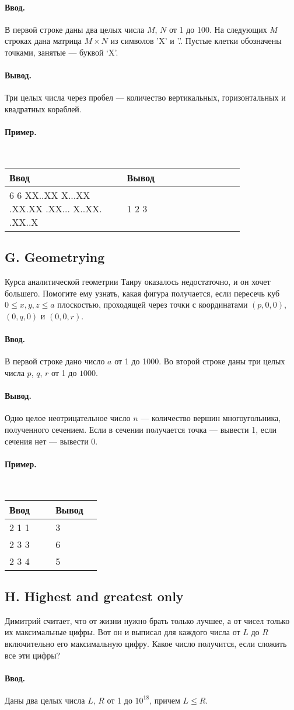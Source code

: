 \documentclass[12pt, a4paper]{article}
\newcommand{\informat}[1]
{
	\paragraph{Ввод.\\} #1
}
\newcommand{\outformat}[1]
{
	\paragraph{Вывод.\\} #1
}
\newcommand{\example}[2]
{
	\paragraph{Пример.\\}
	{\tt
	\begin{tabular}{|p{0.4\linewidth}|p{0.4\linewidth}|}
	\hline
	Ввод & Вывод \\
	\hline
	#1 & #2		\\
	\hline
	\end{tabular}
	}
}
\newcommand{\exampleee}[6]
{
	\paragraph{Пример.\\}
	{\tt
	\begin{tabular}{|p{0.4\linewidth}|p{0.4\linewidth}|}
	\hline
	Ввод 	& Вывод  	\\
	\hline
	#1 		& #2 		\\
	\hline
	#3		& #4		\\
	\hline
	#5		& #6		\\
	\hline
	\end{tabular}
	}
}
\begin{document}
\informat{В первой строке даны два целых числа $M$, $N$ от 1 до 100. На следующих $M$ строках дана матрица $M \times N$ из символов 'X' и '.'. Пустые клетки обозначены точками, занятые --- буквой ‘X’. }

\outformat{Три целых числа через пробел --- количество вертикальных, горизонтальных и квадратных кораблей.}

\example{
6 6\newline
XX..XX\newline
X...XX\newline
.XX.XX\newline
.XX...\newline
X..XX.\newline
.XX..X
}{1 2 3}

\newpage

\subsection*{G. Geometrying}

Курса аналитической геометрии Таиру оказалось недостаточно, и он хочет большего. Помогите ему узнать, какая фигура получается, если пересечь куб $0 \leqslant x, y, z \leqslant a$ плоскостью, проходящей через точки с координатами $(p, 0, 0)$, $(0, q, 0)$ и $(0, 0, r)$.

\informat{В первой строке дано число $a$ от 1 до 1000. Во второй строке даны три целых числа $p$, $q$, $r$ от 1 до $1000$.}

\outformat{Одно целое неотрицательное число $n$ --- количество вершин многоугольника, полученного сечением. Если в сечении получается точка --- вывести 1, если сечения нет --- вывести 0.}

\exampleee{
2 \newline
1 1 1}{3}{
2\newline
3 3 3}{6}{
2 \newline
2 3 4}{5}

\newpage

\subsection*{H. Highest and greatest only}

Димитрий считает, что от жизни нужно брать только лучшее, а от чисел только их максимальные цифры. Вот он и выписал для каждого числа от $L$ до $R$ включительно его максимальную цифру. Какое число получится, если сложить все эти цифры?

\informat{Даны два целых числа $L$, $R$ от 1 до $10^{18}$, причем $L \leqslant R$.}
\end{document}
